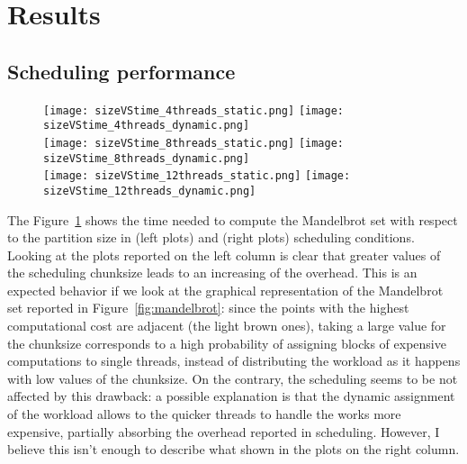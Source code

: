 \section{Results}\label{sec:result}

\subsection{Scheduling performance}\label{sec:res-sched}

\begin{figure}[p!]
    \centering
    \null\hfill
    \texttt{[image: sizeVStime\_4threads\_static.png]}
    \null\hfill
    \texttt{[image: sizeVStime\_4threads\_dynamic.png]}
    \null\hfill
    \\
    \null\hfill
    \texttt{[image: sizeVStime\_8threads\_static.png]}
    \null\hfill
    \texttt{[image: sizeVStime\_8threads\_dynamic.png]}
    \null\hfill
    \\
    \null\hfill
    \texttt{[image: sizeVStime\_12threads\_static.png]}
    \null\hfill
    \texttt{[image: sizeVStime\_12threads\_dynamic.png]}
    \null\hfill
    \caption{\label{fig:sched}}
\end{figure}

The Figure~\ref{fig:sched} shows the time needed to compute the Mandelbrot set with respect to the partition size in  (left plots) and  (right plots) scheduling conditions. Looking at the plots reported on the left column is clear that greater values of the scheduling chunksize leads to an increasing of the overhead. This is an expected behavior if we look at the graphical representation of the Mandelbrot set reported in Figure~\ref{fig:mandelbrot}: since the points with the highest computational cost are adjacent (the light brown ones), taking a large value for the chunksize corresponds to a high probability of assigning blocks of expensive computations to single threads, instead of distributing the workload as it happens with low values of the chunksize. On the contrary, the  scheduling seems to be not affected by this drawback: a possible explanation is that the dynamic assignment of the workload allows to the quicker threads to handle the works more expensive, partially absorbing the overhead reported in  scheduling. However, I believe this isn't enough to describe what shown in the plots on the right column.

